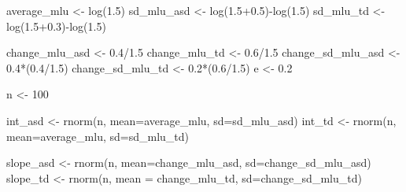 \documentclass[
]{article}
\newenvironment{Shaded}{\begin{snugshade}}{\end{snugshade}}
\newcommand{\AttributeTok}[1]{\textcolor[rgb]{0.77,0.63,0.00}{#1}}
\newcommand{\DecValTok}[1]{\textcolor[rgb]{0.00,0.00,0.81}{#1}}
\newcommand{\FloatTok}[1]{\textcolor[rgb]{0.00,0.00,0.81}{#1}}
\newcommand{\FunctionTok}[1]{\textcolor[rgb]{0.00,0.00,0.00}{#1}}
\newcommand{\NormalTok}[1]{#1}
\newcommand{\OtherTok}[1]{\textcolor[rgb]{0.56,0.35,0.01}{#1}}
\newcommand{\SpecialCharTok}[1]{\textcolor[rgb]{0.00,0.00,0.00}{#1}}
\begin{document}
\begin{Shaded}
\begin{Highlighting}[]
\NormalTok{average\_mlu }\OtherTok{\textless{}{-}} \FunctionTok{log}\NormalTok{(}\FloatTok{1.5}\NormalTok{)}
\NormalTok{ sd\_mlu\_asd }\OtherTok{\textless{}{-}} \FunctionTok{log}\NormalTok{(}\FloatTok{1.5+0.5}\NormalTok{)}\SpecialCharTok{{-}}\FunctionTok{log}\NormalTok{(}\FloatTok{1.5}\NormalTok{)}
\NormalTok{ sd\_mlu\_td }\OtherTok{\textless{}{-}} \FunctionTok{log}\NormalTok{(}\FloatTok{1.5+0.3}\NormalTok{)}\SpecialCharTok{{-}}\FunctionTok{log}\NormalTok{(}\FloatTok{1.5}\NormalTok{)}
 
\NormalTok{ change\_mlu\_asd }\OtherTok{\textless{}{-}} \FloatTok{0.4}\SpecialCharTok{/}\FloatTok{1.5}
\NormalTok{ change\_mlu\_td }\OtherTok{\textless{}{-}} \FloatTok{0.6}\SpecialCharTok{/}\FloatTok{1.5}
\NormalTok{ change\_sd\_mlu\_asd }\OtherTok{\textless{}{-}} \FloatTok{0.4}\SpecialCharTok{*}\NormalTok{(}\FloatTok{0.4}\SpecialCharTok{/}\FloatTok{1.5}\NormalTok{)}
\NormalTok{ change\_sd\_mlu\_td }\OtherTok{\textless{}{-}} \FloatTok{0.2}\SpecialCharTok{*}\NormalTok{(}\FloatTok{0.6}\SpecialCharTok{/}\FloatTok{1.5}\NormalTok{)}
\NormalTok{ e }\OtherTok{\textless{}{-}} \FloatTok{0.2}

\NormalTok{n }\OtherTok{\textless{}{-}} \DecValTok{100}
\end{Highlighting}
\end{Shaded}

\begin{Shaded}
\begin{Highlighting}[]
\NormalTok{int\_asd }\OtherTok{\textless{}{-}} \FunctionTok{rnorm}\NormalTok{(n, }\AttributeTok{mean=}\NormalTok{average\_mlu, }\AttributeTok{sd=}\NormalTok{sd\_mlu\_asd)}
\NormalTok{int\_td }\OtherTok{\textless{}{-}} \FunctionTok{rnorm}\NormalTok{(n, }\AttributeTok{mean=}\NormalTok{average\_mlu, }\AttributeTok{sd=}\NormalTok{sd\_mlu\_td)}

\NormalTok{slope\_asd }\OtherTok{\textless{}{-}} \FunctionTok{rnorm}\NormalTok{(n, }\AttributeTok{mean=}\NormalTok{change\_mlu\_asd, }\AttributeTok{sd=}\NormalTok{change\_sd\_mlu\_asd)}
\NormalTok{slope\_td }\OtherTok{\textless{}{-}} \FunctionTok{rnorm}\NormalTok{(n, }\AttributeTok{mean =}\NormalTok{ change\_mlu\_td, }\AttributeTok{sd=}\NormalTok{change\_sd\_mlu\_td)}
\end{Highlighting}
\end{Shaded}
\end{document}
